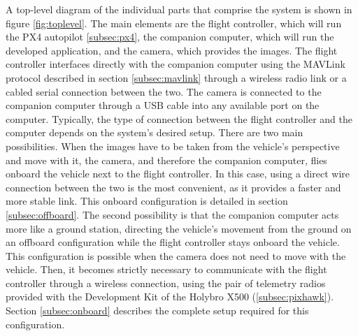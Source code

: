 A top-level diagram of the individual parts that comprise the system is shown in figure \ref{fig:toplevel}. The main elements are the flight controller, which will run the PX4 autopilot \ref{subsec:px4}, the companion computer, which will run the developed application, and the camera, which provides the images.
The flight controller interfaces directly with the companion computer using the MAVLink protocol described in section \ref{subsec:mavlink} through a wireless radio link or a cabled serial connection between the two.
The camera is connected to the companion computer through a USB cable into any available port on the computer.
Typically, the type of connection between the flight controller and the computer depends on the system's desired setup.
There are two main possibilities.
When the images have to be taken from the vehicle's perspective and move with it, the camera, and therefore the companion computer, flies onboard the vehicle next to the flight controller. 
In this case, using a direct wire connection between the two is the most convenient, as it provides a faster and more stable link. 
This onboard configuration is detailed in section \ref{subsec:offboard}.
The second possibility is that the companion computer acts more like a ground station, directing the vehicle's movement from the ground on an offboard configuration while the flight controller stays onboard the vehicle.
This configuration is possible when the camera does not need to move with the vehicle.
Then, it becomes strictly necessary to communicate with the flight controller through a wireless connection, using the pair of telemetry radios provided with the Development Kit of the Holybro X500 (\ref{subsec:pixhawk}).
Section \ref{subsec:onboard} describes the complete setup required for this configuration.

